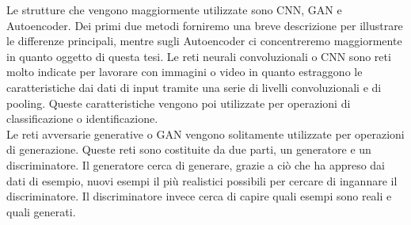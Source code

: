 Le strutture che vengono maggiormente utilizzate sono CNN, GAN e Autoencoder. Dei primi due metodi forniremo una breve descrizione per illustrare le differenze principali, mentre sugli Autoencoder ci concentreremo maggiormente in quanto oggetto di questa tesi.
Le reti neurali convoluzionali o CNN sono reti molto indicate per lavorare con immagini o video in quanto estraggono le caratteristiche dai dati di input tramite una serie di livelli convoluzionali e di pooling. Queste caratteristiche vengono poi utilizzate per operazioni di classificazione o identificazione.\\
Le reti avversarie generative o GAN vengono solitamente utilizzate per operazioni di generazione. Queste reti sono costituite da due parti, un generatore e un discriminatore. Il generatore cerca di generare, grazie a ciò che ha appreso dai dati di esempio, nuovi esempi il più realistici possibili per cercare di ingannare il discriminatore. Il discriminatore invece cerca di capire quali esempi sono reali e quali generati. 


